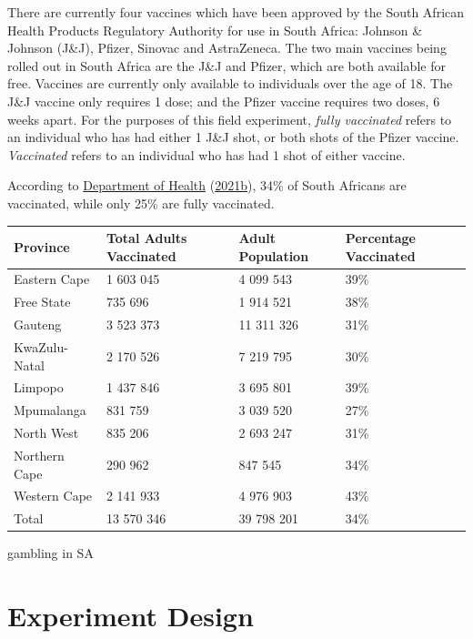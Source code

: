 \documentclass[11pt,preprint, authoryear]{elsarticle}
\let\origtable\table
\let\endorigtable\endtable
\renewenvironment{table}[1][2] {
    \expandafter\origtable\expandafter[H]
} {
    \endorigtable
}
\numberwithin{equation}{section}
\numberwithin{figure}{section}
\numberwithin{table}{section}
\begin{document}
There are currently four vaccines which have been approved by the South
African Health Products Regulatory Authority for use in South Africa:
Johnson \& Johnson (J\&J), Pfizer, Sinovac and AstraZeneca. The two main
vaccines being rolled out in South Africa are the J\&J and Pfizer, which
are both available for free. Vaccines are currently only available to
individuals over the age of 18. The J\&J vaccine only requires 1 dose;
and the Pfizer vaccine requires two doses, 6 weeks apart. For the
purposes of this field experiment, \emph{fully vaccinated} refers to an
individual who has had either 1 J\&J shot, or both shots of the Pfizer
vaccine. \emph{Vaccinated} refers to an individual who has had 1 shot of
either vaccine.

According to \protect\hyperlink{ref-stat}{Department of Health}
(\protect\hyperlink{ref-stat}{2021b}), 34\% of South Africans are
vaccinated, while only 25\% are fully vaccinated.

\begin{table}[H]
\centering
\begin{tabular}{llll}
  \toprule
Province & Total Adults Vaccinated & Adult Population & Percentage Vaccinated \\ 
  \midrule
Eastern Cape & 1 603 045 & 4 099 543 & 39\% \\ 
  Free State & 735 696 & 1 914 521 & 38\% \\ 
  Gauteng & 3 523 373 & 11 311 326 & 31\% \\ 
  KwaZulu-Natal & 2 170 526 & 7 219 795 & 30\% \\ 
  Limpopo & 1 437 846 & 3 695 801 & 39\% \\ 
  Mpumalanga & 831 759 & 3 039 520 & 27\% \\ 
  North West & 835 206 & 2 693 247 & 31\% \\ 
  Northern Cape & 290 962 & 847 545 & 34\% \\ 
  Western Cape & 2 141 933 & 4 976 903 & 43\% \\ 
  Total & 13 570 346 & 39 798 201 & 34\% \\ 
   \bottomrule
\end{tabular}
\caption{Vaccination Statistics \label{tab1}} 
\end{table}

gambling in SA

\hypertarget{experiment-design}{%
\section{\texorpdfstring{Experiment Design
\label{design}}{Experiment Design }}\label{experiment-design}}
\end{document}
